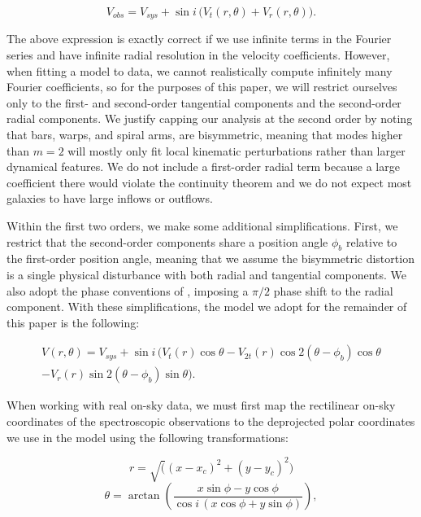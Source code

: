 \begin{equation}
    V_{obs} = V_{sys} + \sin i \, \big(V_t(r,\theta) + V_r(r,\theta) \big).
\end{equation}

The above expression is exactly correct if we use infinite terms in the Fourier series and have infinite radial resolution in the velocity coefficients. However, when fitting a model to data, we cannot realistically compute infinitely many Fourier coefficients, so for the purposes of this paper, we will restrict ourselves only to the first- and second-order tangential components and the second-order radial components. We justify capping our analysis at the second order by noting that bars, warps, and spiral arms, are bisymmetric, meaning that modes higher than $m=2$ will mostly only fit local kinematic perturbations rather than larger dynamical features. We do not include a first-order radial term because a large coefficient there would violate the continuity theorem and we do not expect most galaxies to have large inflows or outflows.

Within the first two orders, we make some additional simplifications. First, we restrict that the second-order components share a position angle $\phi_b$ relative to the first-order position angle, meaning that we assume the bisymmetric distortion is a single physical disturbance with both radial and tangential components. We also adopt the phase conventions of \cite{spekkens07}, imposing a $\pi/2$ phase shift to the radial component. With these simplifications, the model we adopt for the remainder of this paper is the following:

\begin{multline} \label{model}
    V(r, \theta) = V_{sys} + \sin i \, \big(V_t(r) \cos \theta - V_{2t}(r) \cos2 (\theta - \phi_b) \cos \theta \\ - V_r(r) \sin 2 (\theta - \phi_b) \sin \theta \big).
\end{multline}

When working with real on-sky data, we must first map the rectilinear on-sky coordinates of the spectroscopic observations to the deprojected polar coordinates we use in the model using the following transformations:

\begin{equation}
    r = \sqrt((x - x_c)^2 + (y - y_c)^2)
\end{equation}
\begin{equation}
    \theta = \arctan\left(\frac{x \sin \phi - y \cos \phi}{\cos i\, (x \cos \phi + y \sin \phi)}\right),
\end{equation}

